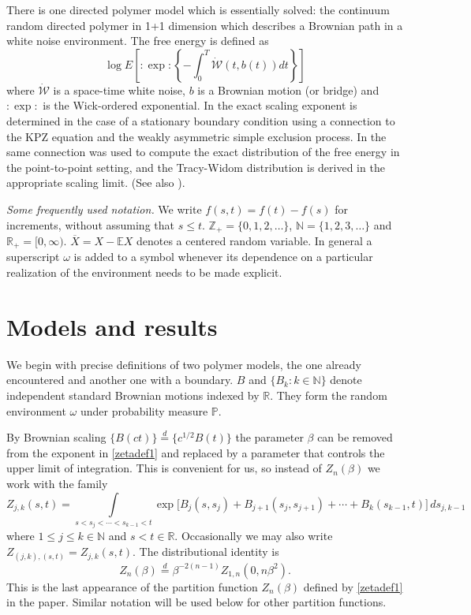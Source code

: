 \documentclass[11pt]{amsart}
\numberwithin{equation}{section}
\theoremstyle{remark}
\begin{document}
There is one  directed polymer model which is essentially solved: the continuum random directed polymer in 1+1 dimension which describes a Brownian path in a white noise environment. 
 The free energy is defined as
\begin{equation} \nonumber
\log E \left[:\!\exp\!:  \left\{-\int_0^T  \dot{\mathcal W}(t,b(t)) dt    \right\}     \right]
\end{equation}
where $\dot{\mathcal W}$ is a space-time white noise,  $b$ is a Brownian motion (or bridge) and $:\!\!\exp\!\!:$ is the Wick-ordered exponential. In \cite{bala-quas-sepp} the exact scaling exponent is determined in the case of a stationary boundary condition using a connection to the KPZ equation and the
weakly asymmetric simple exclusion process. 
In \cite{amir-corw-quas} the same connection was used to compute the exact distribution of the free energy in the point-to-point setting, and the Tracy-Widom distribution is derived in the appropriate scaling limit. (See also \cite{sasa-spoh}).

 

\medskip

{\sl Some frequently used notation.} 
We write $f(s,t)=f(t)-f(s)$ for increments, without assuming that $s\le t$. 
${\mathbb{Z}}_+=\{0,1,2,\dotsc\}$, ${\mathbb{N}}=\{1,2,3,\dotsc\}$ and ${\mathbb{R}}_+=[0,\infty)$. 
  $\overline{X}=X-{\mathbb{E}} X$ denotes a centered random variable.  
In general a superscript ${\omega}$ is added to a symbol whenever its dependence
on a particular realization of the environment needs to be made explicit.  

\section{Models and results}

We begin with precise definitions of two polymer models, the one already encountered
and another one with a boundary.  
$B$ and $\{B_k: k\in{\mathbb{N}}\}$ 
 denote  independent  standard  Brownian motions indexed by ${\mathbb{R}}$.
 They form the random environment ${\omega}$ under probability measure ${\mathbb{P}}$. 

By Brownian scaling $\{B(ct)\}{\stackrel{d}{=}}\{c^{1/2}B(t)\}$  
the parameter $\beta$ can be removed  from the exponent in \eqref{zetadef1}
and replaced by a parameter that controls the upper limit of integration.  
This is   convenient for us,  so instead of  ${{Z}}_n(\beta)$ 
 we work with the family 
\begin{equation} Z_{j,k}(s,t) = 
\int\limits_{s<s_{j}<\dotsm<s_{k-1}<t}  \exp\bigl[ B_j(s,s_j) +B_{j+1}(s_j,s_{j+1})
+\dotsm + B_k(s_{k-1},t)\bigr] \,ds_{j,k-1}
\label{Zdef1.1}\end{equation}
where $1\le j\le k\in {\mathbb{N}}$ and $s<t\in{\mathbb{R}}$.  Occasionally we may also write
$Z_{(j,k),(s,t)} =Z_{j,k}(s,t)$.  The distributional identity is 
\begin{equation} {{Z}}_n(\beta){\stackrel{d}{=}}\beta^{-2(n-1)}Z_{1,n}(0,{n}\beta^2).\label{brscal}\end{equation}
 This is the last appearance of the partition function $Z_n(\beta)$ defined by \eqref{zetadef1}
 in the paper.   Similar notation will be used below for other partition functions.  
 
\end{document}
